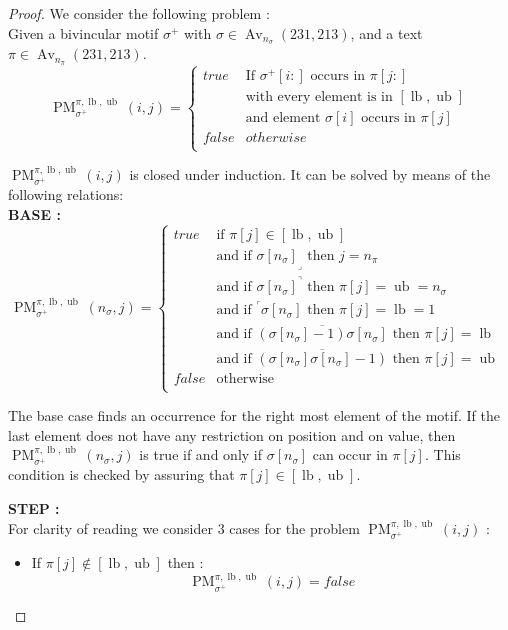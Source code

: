 \documentclass[a4paper]{llncs}
\DeclareMathOperator{\Avd}{Av}
\newcommand\Av[2]{\Avd_{{#1}}({#2})}
\newcommand{\ptext}{\pi}
\newcommand{\pmotif}{\sigma}
\newcommand{\pbmotif}{\pmotif^+}
\DeclareMathOperator{\PMa}{PM}
\newcommand{\PM}[6]{\PMa_{{#1}}^{{#2},{#3},{#4}}({#5},{#6})}
\DeclareMathOperator{\lb}{lb}
\DeclareMathOperator{\ub}{ub}
\begin{document}
\begin{proof}
We consider the following problem :\\
Given a bivincular motif $\pbmotif$ with $\pmotif \in \Av{n_\pmotif}{231,213} $, and a text $\ptext \in \Av{n_\ptext}{231,213}$.
$$
\PM{\pbmotif}{\ptext}{\lb}{\ub}{i}{j}=
\begin{cases}
	true 	& \text{If $\pbmotif[i:]$ occurs in $\ptext[j:]$}\\
			& \text{with every element is in $[\lb,\ub]$}\\
			& \text{and element $\pmotif[i]$ occurs in $\ptext[j]$ }\\
	false 	& otherwise\\
\end{cases}
$$

$\PM{\pbmotif}{\ptext}{\lb}{\ub}{i}{j}$ is closed under induction.
It can be solved by means of the following relations:\\
\textbf{BASE :} \\
$$
\PM{\pbmotif}{\ptext}{\lb}{\ub}{n_\pmotif}{j}=
\begin{cases}
	true 	& \text{if $\ptext[j] \in [\lb,\ub ]$}\\
			& \text{and if ${\pmotif[n_\pmotif]}_\lrcorner$ then $j=n_\ptext$}\\
			& \text{and if ${\pmotif[n_\pmotif]}^\urcorner$ then $\ptext[j]=\ub=n_\pmotif$}\\
			& \text{and if  $^\ulcorner{\pmotif[n_\pmotif]}$ then $\ptext[j]=\lb=1$ } \\
			& \text{and if  $\overline{(\pmotif[n_\pmotif]-1)\pmotif[n_\pmotif] }$ then $\ptext[j]=\lb$ }  \\
			& \text{and if  $\overline{(\pmotif[n_\pmotif]\pmotif[n_\pmotif]-1)}$ then $\ptext[j]=\ub$}  \\

	false	& \text{otherwise} \\
\end{cases}
$$


The base case finds an occurrence for the right most element of the motif. If the last element does not have any restriction on position and on value, then $\PM{\pbmotif}{\ptext}{\lb}{\ub}{n_\pmotif}{j}$ is true if and only if $\pmotif[n_\pmotif]$ can occur in $\ptext[j]$. This condition is checked by assuring that $\ptext[j] \in [\lb,\ub]$. 

\textbf{STEP :} \\
For clarity of reading we consider 3 cases for the problem $\PM{\pbmotif}{\ptext}{\lb}{\ub}{i}{j}$ :
\begin{itemize}
	\item If $\ptext[j] \notin [\lb,\ub]$ then :
	$$
	\PM{\pbmotif}{\ptext}{\lb}{\ub}{i}{j} = false
	$$


\end{itemize}
\end{proof}
\end{document}

